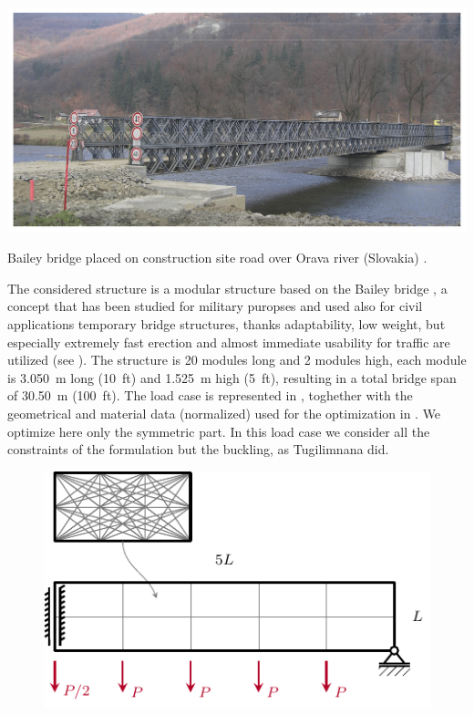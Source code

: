 \begin{marginfigure}
    \centering
    \includegraphics[width=\linewidth]{figures/06_DMO/00_bailey_bridge/applsci-12-03788-g002.png}
    \caption{Bailey bridge placed on construction site road over Orava river (Slovakia) \cite{prokop_load-carrying_2022}. }
    \label{fig:06_bailey}
\end{marginfigure}

The considered structure is a modular structure based on the Bailey bridge , a concept that has been studied for military puropses and used also for civil applications \eg temporary bridge structures, thanks adaptability, low weight, but especially extremely fast erection and almost immediate usability for traffic are utilized (see ). The structure is 20 modules long and 2 modules high, each module is \qty{3.050}{m} long (\qty{10}{ft}) and \qty{1.525}{m} high (\qty{5}{ft}), resulting in a total bridge span of \qty{30.50}{m} (\qty{100}{ft}). The load case is represented in , toghether with the geometrical and material data (normalized) used for the optimization in . We optimize here only the symmetric part. In this load case we consider all the constraints of the formulation  but the buckling, as Tugilimnana did.

\begin{figure}
    \centering
    \includegraphics{figures/06_DMO/00_tug_bench_bcs/bcs.pdf}
    \caption{}
    \label{fig:06_tug_bcs}
\end{figure}


